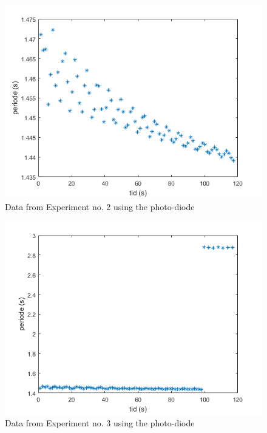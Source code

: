\documentclass[%
 reprint,
 amsmath,amssymb,
 aps,
]{revtex4-1}
\begin{document}
    \begin{figure}[h!]
    	\center
    	\includegraphics[scale=0.6]{forsok2fig1}
    	\caption{Data from Experiment no. 2 using the photo-diode}
        \label{fig:data2}
    \end{figure}

    \begin{figure}[h!]
    	\center
    	\includegraphics[scale=0.6]{forsok3fig1}
    	\caption{Data from Experiment no. 3 using the photo-diode}
        \label{fig:data3}
    \end{figure}
\end{document}
